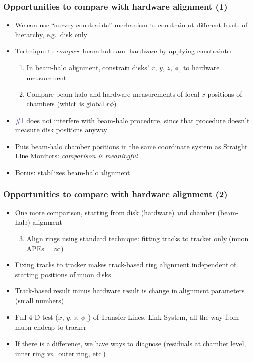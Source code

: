 \documentclass[compress]{beamer}
\begin{document}
\begin{frame}
\frametitle{Opportunities to compare with hardware alignment (1)}
\begin{itemize}
\item We can use ``survey constraints'' mechanism to constrain at
different levels of hierarchy, e.g.\ disk only
\item Technique to \underline{\it compare} beam-halo and hardware by applying constraints:
\begin{enumerate}
\item In beam-halo alignment, constrain disks' $x$, $y$, $z$, $\phi_z$ to hardware measurement
\item Compare beam-halo and hardware measurements of local $x$ positions of chambers (which is global $r\phi$)
\end{enumerate}
\item \textcolor{darkblue}{\#1} does not interfere with beam-halo
procedure, since that procedure doesn't measure disk positions anyway
\item Puts beam-halo chamber positions in the same coordinate
system as Straight Line Monitors: {\it comparison is meaningful}
\item Bonus: stabilizes beam-halo alignment
\end{itemize}
\end{frame}

\begin{frame}
\frametitle{Opportunities to compare with hardware alignment (2)}
\begin{itemize}\setlength{\itemsep}{0.25 cm}
\item One more comparison, starting from disk (hardware) and chamber (beam-halo) alignment
\begin{enumerate}
\setcounter{enumi}{2}
\item Align rings using standard technique: fitting tracks to tracker only (muon APEs = $\infty$)
\end{enumerate}
\item Fixing tracks to tracker makes track-based ring alignment independent of starting positions of muon disks
\item Track-based result minus hardware result is change in alignment parameters (small numbers)
\item Full 4-D test ($x$, $y$, $z$, $\phi_z$) of Transfer Lines, Link System, all the way from muon endcap to tracker
\item If there is a difference, we have ways to diagnose (residuals at
chamber level, inner ring vs.\ outer ring, etc.)
\end{itemize}

\label{numpages}
\end{frame}
\end{document}
